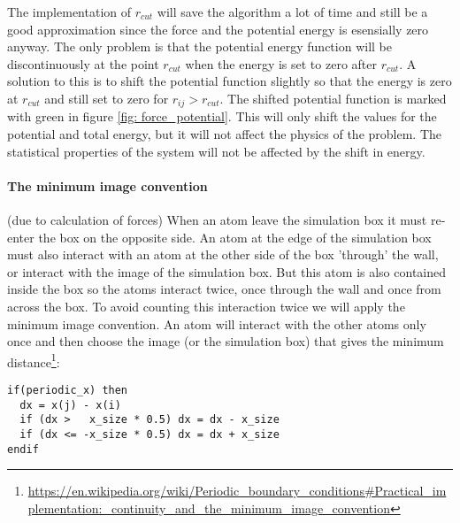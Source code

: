 \documentclass[11pt,a4wide]{article}
\begin{document}
The implementation of $r_{cut}$ will save the algorithm a lot of time and still be a good approximation since the force and the potential energy is esensially zero anyway. The only problem is that the potential energy function will be discontinuously at the point $r_{cut}$ when the energy is set to zero after $r_{cut}$. A solution to this is to shift the potential function slightly so that the energy is zero at $r_{cut}$ and still set to zero for $r_{ij}>r_{cut}$. The shifted potential function is marked with green in figure \ref{fig: force_potential}. This will only shift the values for the potential and total energy, but it will not affect the physics of the problem. The statistical properties of the system will not be affected by the shift in energy. 


\paragraph{The minimum image convention} (due to calculation of forces)
When an atom leave the simulation box it must re-enter the box on the opposite side. An atom at the edge of the simulation box must also interact with an atom at the other side of the box 'through' the wall, or interact with the image of the simulation box. But this atom is also contained inside the box so the atoms interact twice, once through the wall and once from across the box. To avoid counting this interaction twice we will apply the minimum image convention. An atom will interact with the other atoms only once and then choose the image (or the simulation box) that gives the minimum distance\footnote{\url{https://en.wikipedia.org/wiki/Periodic\_boundary\_conditions\#Practical\_implementation:\_continuity\_and\_the\_minimum\_image\_convention}}:

\begin{lstlisting}
if(periodic_x) then
  dx = x(j) - x(i)
  if (dx >   x_size * 0.5) dx = dx - x_size
  if (dx <= -x_size * 0.5) dx = dx + x_size
endif
\end{lstlisting}
\end{document}
